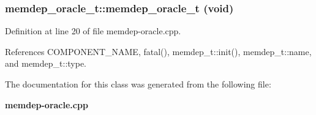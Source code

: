 \subsubsection[{memdep\_\-oracle\_\-t}]{\setlength{\rightskip}{0pt plus 5cm}memdep\_\-oracle\_\-t::memdep\_\-oracle\_\-t (void)\hspace{0.3cm}{\tt  [inline]}}\label{classmemdep__oracle__t_5ee3528e42a712d07e1af89fa5974223}




Definition at line 20 of file memdep-oracle.cpp.

References COMPONENT\_\-NAME, fatal(), memdep\_\-t::init(), memdep\_\-t::name, and memdep\_\-t::type.

The documentation for this class was generated from the following file:\begin{CompactItemize}
\item 
{\bf memdep-oracle.cpp}\end{CompactItemize}
